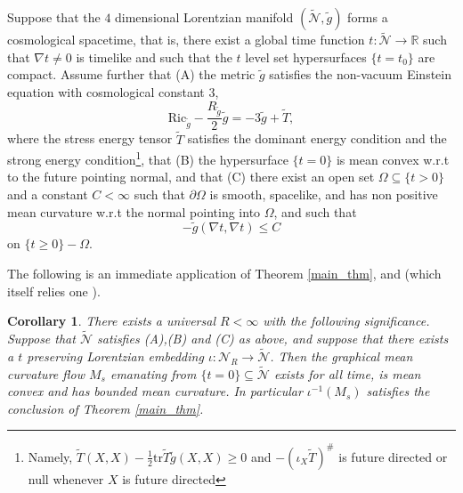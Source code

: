 \documentclass[leqno,11pt]{amsart}
\newtheorem{corollary}[theorem]{Corollary}
\theoremstyle{definition}
\begin{document}
Suppose that the $4$ dimensional Lorentzian manifold $(\tilde{\mathcal{N}},\tilde{g})$ forms a cosmological spacetime, that is, there exist a global time function $t:\tilde{\mathcal{N}}\rightarrow \mathbb{R}$ such that $\nabla t \neq 0$ is timelike and such that the $t$ level set hypersurfaces $\{t=t_0\}$ are compact. Assume further that (A) the metric $\tilde{g}$ satisfies the non-vacuum Einstein equation with cosmological constant $3$,
\begin{equation}
\mathrm{Ric}_{\tilde{g}}-\frac{R_{\tilde{g}}}{2}\tilde{g}=-3\tilde{g}+\tilde{T},
\end{equation}
where the stress energy tensor $\tilde{T}$ satisfies the dominant energy condition and the strong energy condition\footnote{Namely, $\tilde{T}(X,X)-\frac{1}{2}\mathrm{tr}\tilde{T}\tilde{g}(X,X)\geq 0$ and $-(\iota_X \tilde{T})^{\#}$ is future directed or null whenever $X$ is future directed }, that (B) the hypersurface $\{t=0\}$ is mean convex w.r.t to the future pointing normal, and that (C) there exist an open set $\Omega \subseteq \{t>0\}$  and a constant $C<\infty$ such that $\partial \Omega$ is smooth, spacelike, and has non positive mean curvature w.r.t the normal pointing into $\Omega$, and such that 
\[
-\tilde{g}(\nabla t,\nabla t) \leq C
\]
on $\{t\geq 0\}-\Omega$.

The following is an immediate application of Theorem \ref{main_thm}, and \cite[Theorem 2, Theorem 3]{CSV} (which itself relies one  \cite[Theorem 4.1]{Ecker_Huisken_lor}).
\begin{corollary}\label{main_cor}
There exists a universal $R<\infty$ with the following significance. Suppose that $\tilde{\mathcal{N}}$ satisfies (A),(B) and (C) as above, and suppose that  there exists a $t$ preserving Lorentzian embedding $\iota: \mathcal{N}_R\rightarrow \tilde{\mathcal{N}}$. Then the graphical mean curvature flow $M_s$ emanating from $\{t=0\} \subseteq \tilde{\mathcal{N}}$ exists for all time, is mean convex and has bounded mean curvature. In particular $\iota^{-1}(M_s)$ satisfies the conclusion of Theorem \ref{main_thm}.  
\end{corollary}
\end{document}
